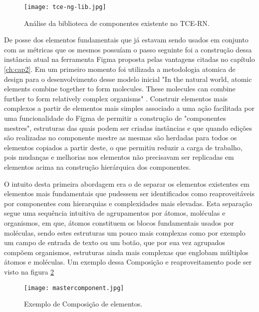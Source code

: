 \begin{figure}[!h]
	\texttt{[image: tce-ng-lib.jpg]}
	\caption{Análise da biblioteca de componentes existente no TCE-RN.}
	\label{fig:tcenglib}
\end{figure}

De posse dos elementos fundamentais que já estavam sendo usados em conjunto com as métricas que os mesmos possuíam o passo seguinte foi a construção dessa instância atual na ferramenta Figma proposta pelas vantagens citadas no capítulo \ref{ch:cap2}. Em um primeiro momento foi utilizada a metodologia atomica de design para o desenvolvimento desse modelo inicial "In the natural world, atomic elements combine together to form molecules. These molecules can combine further to form relatively complex organisms" \cite{atomic_design}. Construir elementos mais complexos a partir de elementos mais simples associado a uma ação facilitada por uma funcionalidade do Figma de permitir a construção de "componentes mestres", estruturas das quais podem ser criadas instâncias e que quando edições são realizadas no componente mestre as mesmas são herdadas para todos os elementos copiados a partir deste, o que permitiu reduzir a carga de trabalho, pois mudanças e melhorias nos elementos não precisavam ser replicadas em elementos acima na construção hierárquica dos componentes.

O intuito desta primeira abordagem era o de separar os elementos existentes em elementos mais fundamentais que pudessem ser identificados como reaproveitáveis por componentes com hierarquias e complexidades mais elevadas. Esta separação segue uma sequência intuitiva de agrupamentos por átomos, moléculas e organismos, em que, átomos constituem os blocos fundamentais usados por moléculas, sendo estes estruturas um pouco mais complexas como por exemplo um campo de entrada de texto ou um botão, que por sua vez agrupados compõem organismos, estruturas ainda mais complexas que englobam múltiplos átomos e moléculas. Um exemplo dessa Composição e reaproveitamento pode ser visto na figura \ref{fig:mastercomponent}

\begin{figure}[h!]
	\texttt{[image: mastercomponent.jpg]}
	\caption{Exemplo de Composição de elementos.}
	\label{fig:mastercomponent}
\end{figure}

